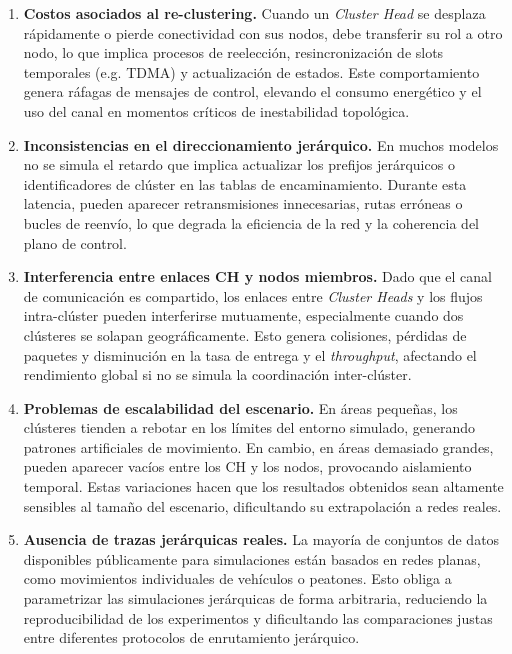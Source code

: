 \documentclass{article}
\begin{document}
\begin{enumerate}
    \item \textbf{Costos asociados al re-clustering.}
    Cuando un \textit{Cluster Head} se desplaza rápidamente o pierde conectividad con sus nodos, debe transferir su rol a otro nodo, lo que implica procesos de reelección, resincronización de slots temporales (e.g. TDMA) y actualización de estados. Este comportamiento genera ráfagas de mensajes de control, elevando el consumo energético y el uso del canal en momentos críticos de inestabilidad topológica.

    \item \textbf{Inconsistencias en el direccionamiento jerárquico.}
    En muchos modelos no se simula el retardo que implica actualizar los prefijos jerárquicos o identificadores de clúster en las tablas de encaminamiento. Durante esta latencia, pueden aparecer retransmisiones innecesarias, rutas erróneas o bucles de reenvío, lo que degrada la eficiencia de la red y la coherencia del plano de control.

    \item \textbf{Interferencia entre enlaces CH y nodos miembros.}
    Dado que el canal de comunicación es compartido, los enlaces entre \textit{Cluster Heads} y los flujos intra-clúster pueden interferirse mutuamente, especialmente cuando dos clústeres se solapan geográficamente. Esto genera colisiones, pérdidas de paquetes y disminución en la tasa de entrega y el \textit{throughput}, afectando el rendimiento global si no se simula la coordinación inter-clúster.

    \item \textbf{Problemas de escalabilidad del escenario.}
    En áreas pequeñas, los clústeres tienden a rebotar en los límites del entorno simulado, generando patrones artificiales de movimiento. En cambio, en áreas demasiado grandes, pueden aparecer vacíos entre los CH y los nodos, provocando aislamiento temporal. Estas variaciones hacen que los resultados obtenidos sean altamente sensibles al tamaño del escenario, dificultando su extrapolación a redes reales.

    \item \textbf{Ausencia de trazas jerárquicas reales.}
    La mayoría de conjuntos de datos disponibles públicamente para simulaciones están basados en redes planas, como movimientos individuales de vehículos o peatones. Esto obliga a parametrizar las simulaciones jerárquicas de forma arbitraria, reduciendo la reproducibilidad de los experimentos y dificultando las comparaciones justas entre diferentes protocolos de enrutamiento jerárquico.

\end{enumerate}
\end{document}
